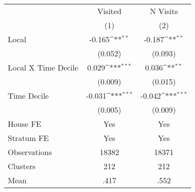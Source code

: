 {
\def\sym#1{\ifmmode^{#1}\else\(^{#1}\)\fi}
\begin{tabular}{l*{2}{c}}
\hline\hline
                &\multicolumn{1}{c}{Visited}&\multicolumn{1}{c}{N Visits}\\
                &\multicolumn{1}{c}{(1)}         &\multicolumn{1}{c}{(2)}         \\
\hline
Local           &   -0.165\sym{**} &   -0.187\sym{**} \\
                &  (0.052)         &  (0.093)         \\
Local X Time Decile&    0.029\sym{***}&    0.036\sym{**} \\
                &  (0.009)         &  (0.015)         \\
Time Decile     &   -0.031\sym{***}&   -0.042\sym{***}\\
                &  (0.005)         &  (0.009)         \\
House FE        &      Yes         &      Yes         \\
Stratum FE      &      Yes         &      Yes         \\
\hline
Observations    &    18382         &    18371         \\
Clusters        &      212         &      212         \\
Mean            &     .417         &     .552         \\
\hline\hline
\end{tabular}
}
